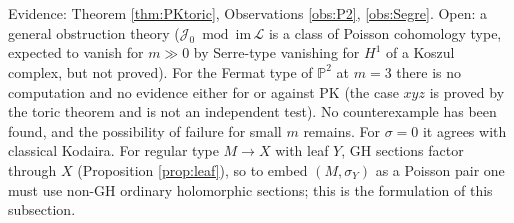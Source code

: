 \noindent Evidence: Theorem \ref{thm:PKtoric}, Observations \ref{obs:P2}, \ref{obs:Segre}. Open: a general obstruction theory ($\mathcal J_0\bmod\mathrm{im}\,\mathcal L$ is a class of Poisson cohomology type, expected to vanish for $m\gg0$ by Serre-type vanishing for $H^1$ of a Koszul complex, but not proved). For the Fermat type of $\mathbb P^2$ at $m=3$ there is no computation and no evidence either for or against PK (the case $xyz$ is proved by the toric theorem and is not an independent test). No counterexample has been found, and the possibility of failure for small $m$ remains. For $\sigma=0$ it agrees with classical Kodaira. For regular type $M\to X$ with leaf $Y$, GH sections factor through $X$ (Proposition \ref{prop:leaf}), so to embed $(M,\sigma_Y)$ as a Poisson pair one must use non-GH ordinary holomorphic sections; this is the formulation of this subsection.
